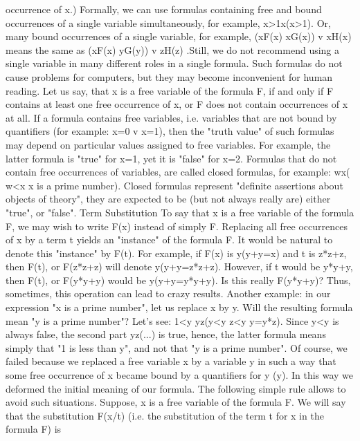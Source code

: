 occurrence of x.)
Formally, we can use formulas containing free and bound occurrences of a single variable simultaneously,
for example, x>1\IMPLIES \exists x(x>1). Or, many bound occurrences of a single variable, for example, (\forall xF(x) \AND 
\exists xG(x)) v \forall xH(x) means the same as (\forall xF(x) \AND  \exists yG(y)) v \forall zH(z) .Still, we do not recommend using a
single variable in many different roles in a single formula. Such formulas do not cause problems for
computers, but they may become inconvenient for human reading.
Let us say, that x is a free variable of the formula F, if and only if F contains at least one free occurrence
of x, or F does not contain occurrences of x at all.
If a formula contains free variables, i.e. variables that are not bound by quantifiers (for example: x=0 v
x=1), then the "truth value" of such formulas may depend on particular values assigned to free variables.
For example, the latter formula is "true" for x=1, yet it is "false" for x=2. Formulas that do not contain
free occurrences of variables, are called closed formulas, for example:
\forall w\exists x( w<x \AND  x is a prime number).
Closed formulas represent "definite assertions about objects of theory", they are expected to be (but not
always really are) either "true", or "false".
Term Substitution
To say that x is a free variable of the formula F, we may wish to write F(x) instead of simply F. Replacing
all free occurrences of x by a term t yields an "instance" of the formula F. It would be natural to denote
this "instance" by F(t).
For example, if F(x) is \exists y(y+y=x) and t is z*z+z, then F(t), or F(z*z+z) will denote \exists y(y+y=z*z+z).
However, if t would be y*y+y, then F(t), or F(y*y+y) would be \exists y(y+y=y*y+y). Is this really F(y*y+y)?
Thus, sometimes, this operation can lead to crazy results. Another example: in our expression "x is a
prime number", let us replace x by y. Will the resulting formula mean "y is a prime number"? Let's see:
1<y \AND  \neg \exists y\exists z(y<y \AND  z<y \AND  y=y*z).
Since y<y is always false, the second part \neg \exists y\exists z(...) is true, hence, the latter formula means simply that
"1 is less than y", and not that "y is a prime number".
Of course, we failed because we replaced a free variable x by a variable y in such a way that some free
occurrence of x became bound by a quantifiers for y (\exists y). In this way we deformed the initial meaning
of our formula.
The following simple rule allows to avoid such situations. Suppose, x is a free variable of the formula F.
We will say that the substitution F(x/t) (i.e. the substitution of the term t for x in the formula F) is
